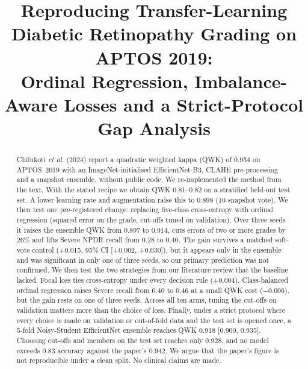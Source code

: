 \documentclass[conference]{IEEEtran}
\begin{document}
\title{Reproducing Transfer-Learning Diabetic Retinopathy Grading on APTOS 2019:\\
Ordinal Regression, Imbalance-Aware Losses and a Strict-Protocol Gap Analysis}
\author{
}
\maketitle

\begin{abstract}
Chilukoti \emph{et al.} (2024) report a quadratic weighted kappa (QWK) of 0.954 on APTOS~2019 with an
ImageNet-initialised EfficientNet-B3, CLAHE pre-processing and a snapshot ensemble, without public code. We
re-implemented the method from the text. With the stated recipe we obtain QWK 0.81--0.82 on a stratified held-out
test set. A lower learning rate and augmentation raise this to 0.898 (10-snapshot vote). We then test one
pre-registered change: replacing five-class cross-entropy with ordinal regression (squared error on the grade,
cut-offs tuned on validation). Over three seeds it raises the ensemble QWK from 0.897 to 0.914, cuts errors of two or
more grades by 26\% and lifts Severe NPDR recall from 0.28 to 0.40. The gain survives a matched soft-vote control
(+0.015, 95\% CI [+0.002, +0.030]), but it appears only in the ensemble and was significant in only one of three
seeds, so our primary prediction was not confirmed. We then test the two strategies from our literature review
that the baseline lacked. Focal loss ties cross-entropy under every decision rule (+0.004). Class-balanced ordinal
regression raises Severe recall from 0.40 to 0.46 at a small QWK cost ($-0.006$), but the gain rests on one of three
seeds. Across all ten arms, tuning the cut-offs on validation matters more than the choice of loss.
Finally, under a strict protocol where every choice is made on validation or out-of-fold data and the test set is
opened once, a 5-fold Noisy-Student EfficientNet ensemble reaches QWK 0.918 [0.900, 0.935]. Choosing cut-offs and
members on the test set reaches only 0.928, and no model exceeds 0.83 accuracy against the paper's 0.942. We argue
that the paper's figure is not reproducible under a clean split. No clinical claims are made.
\end{abstract}

\end{document}
